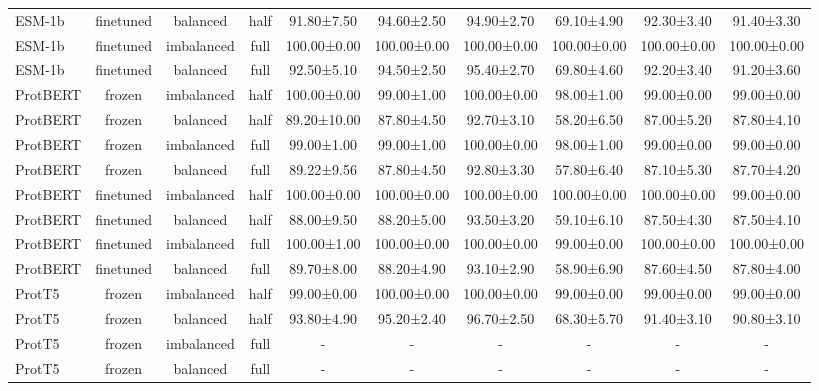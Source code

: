 \begin{tabular}{lccccccccc}
      ESM-1b &      finetuned &   balanced &      half &  91.80±7.50 &  94.60±2.50 &  94.90±2.70 &  69.10±4.90 &  92.30±3.40 &  91.40±3.30 \\
      ESM-1b &      finetuned & imbalanced &      full & 100.00±0.00 & 100.00±0.00 & 100.00±0.00 & 100.00±0.00 & 100.00±0.00 & 100.00±0.00 \\
      ESM-1b &      finetuned &   balanced &      full &  92.50±5.10 &  94.50±2.50 &  95.40±2.70 &  69.80±4.60 &  92.20±3.40 &  91.20±3.60 \\
    ProtBERT &         frozen & imbalanced &      half & 100.00±0.00 &  99.00±1.00 & 100.00±0.00 &  98.00±1.00 &  99.00±0.00 &  99.00±0.00 \\
    ProtBERT &         frozen &   balanced &      half & 89.20±10.00 &  87.80±4.50 &  92.70±3.10 &  58.20±6.50 &  87.00±5.20 &  87.80±4.10 \\
    ProtBERT &         frozen & imbalanced &      full &  99.00±1.00 &  99.00±1.00 & 100.00±0.00 &  98.00±1.00 &  99.00±0.00 &  99.00±0.00 \\
    ProtBERT &         frozen &   balanced &      full &  89.22±9.56 &  87.80±4.50 &  92.80±3.30 &  57.80±6.40 &  87.10±5.30 &  87.70±4.20 \\
    ProtBERT &      finetuned & imbalanced &      half & 100.00±0.00 & 100.00±0.00 & 100.00±0.00 & 100.00±0.00 & 100.00±0.00 &  99.00±0.00 \\
    ProtBERT &      finetuned &   balanced &      half &  88.00±9.50 &  88.20±5.00 &  93.50±3.20 &  59.10±6.10 &  87.50±4.30 &  87.50±4.10 \\
    ProtBERT &      finetuned & imbalanced &      full & 100.00±1.00 & 100.00±0.00 & 100.00±0.00 &  99.00±0.00 & 100.00±0.00 & 100.00±0.00 \\
    ProtBERT &      finetuned &   balanced &      full &  89.70±8.00 &  88.20±4.90 &  93.10±2.90 &  58.90±6.90 &  87.60±4.50 &  87.80±4.00 \\
      ProtT5 &         frozen & imbalanced &      half &  99.00±0.00 & 100.00±0.00 & 100.00±0.00 &  99.00±0.00 &  99.00±0.00 &  99.00±0.00 \\
      ProtT5 &         frozen &   balanced &      half &  93.80±4.90 &  95.20±2.40 &  96.70±2.50 &  68.30±5.70 &  91.40±3.10 &  90.80±3.10 \\
      ProtT5 &         frozen & imbalanced &      full &           - &           - &           - &           - &           - &           - \\
      ProtT5 &         frozen &   balanced &      full &           - &           - &           - &           - &           - &           - \\

\end{tabular}
